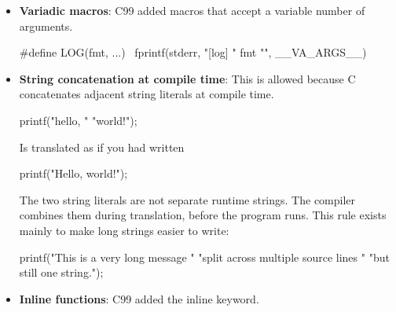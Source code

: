 \documentclass{report}
\begin{document}
\begin{itemize}
\begin{cppcode}
                    draw_point((struct Point){ .x = 10, .y = 20 });
                \end{cppcode}
                \bigbreak \noindent 
                They are also useful for arrays:
                \bigbreak \noindent 
                \begin{cppcode}
                    int *p = (int[]){1, 2, 3, 4};
                \end{cppcode}
                \bigbreak \noindent 
                Inside a function, a compound literal has automatic storage duration. At file scope, it has static storage duration.
            \item \textbf{Variadic macros}: C99 added macros that accept a variable number of arguments.
                \bigbreak \noindent 
                \begin{cppcode}
                    #define LOG(fmt, ...) \
                    fprintf(stderr, "[log] " fmt "\n", __VA_ARGS__)
                \end{cppcode}
            \item \textbf{String concatenation at compile time}: This is allowed because C concatenates adjacent string literals at compile time.
                \bigbreak \noindent 
                \begin{cppcode}
                    printf("hello, " "world!");
                \end{cppcode}
                \bigbreak \noindent 
                Is translated as if you had written
                \bigbreak \noindent 
                \begin{cppcode}
                    printf("Hello, world!");
                \end{cppcode}
                \bigbreak \noindent 
                The two string literals are not separate runtime strings. The compiler combines them during translation, before the program runs.
                \bigbreak \noindent 
                This rule exists mainly to make long strings easier to write:
                \bigbreak \noindent 
                \begin{cppcode}
                    printf("This is a very long message "
                    "split across multiple source lines "
                    "but still one string.\n");
                \end{cppcode}
            \item \textbf{Inline functions}: C99 added the inline keyword.
                \bigbreak \noindent 
                \begin{cppcode}

\end{cppcode}
\end{itemize}
\end{document}
